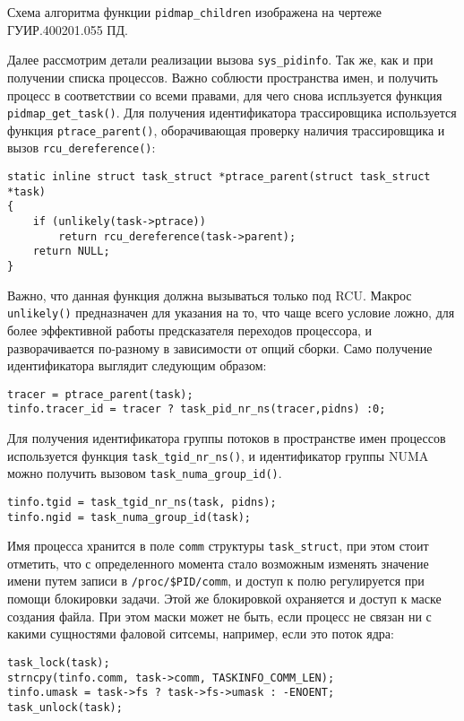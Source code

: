 Схема алгоритма функции \texttt{pidmap\_children} изображена на чертеже
ГУИР.400201.055 ПД.

Далее рассмотрим детали реализации вызова \texttt{sys\_pidinfo}. Так же, как и
при получении списка процессов. Важно соблюсти пространства имен, и получить
процесс в соответствии со всеми правами, для чего снова испльзуется функция
\texttt{pidmap\_get\_task()}. Для получения идентификатора
трассировщика  используется функция \texttt{ptrace\_parent()}, оборачивающая
проверку наличия трассировщика и вызов
\texttt{rcu\_dereference()}:
\medskip
\begin{lstlisting}[style=cstyle]
static inline struct task_struct *ptrace_parent(struct task_struct *task)
{
	if (unlikely(task->ptrace))
		return rcu_dereference(task->parent);
	return NULL;
}
\end{lstlisting}
\medskip

Важно, что данная функция должна вызываться только под RCU. Макрос
\texttt{unlikely()} предназначен для указания на то, что чаще всего условие
ложно, для более эффективной работы предсказателя переходов процессора, и
разворачивается по-разному в зависимости от опций сборки. Само получение
идентификатора выглядит следующим образом:
\medskip
\begin{lstlisting}[style=cstyle]
tracer = ptrace_parent(task);
tinfo.tracer_id = tracer ? task_pid_nr_ns(tracer,pidns) :0;
\end{lstlisting}
\medskip

Для получения идентификатора группы потоков в пространстве имен процессов
используется функция \texttt{task\_tgid\_nr\_ns()}, и идентификатор группы NUMA
можно получить вызовом \texttt{task\_numa\_group\_id()}.
\medskip
\begin{lstlisting}[style=cstyle]
tinfo.tgid = task_tgid_nr_ns(task, pidns);
tinfo.ngid = task_numa_group_id(task);
\end{lstlisting}
\medskip

Имя процесса хранится в поле \texttt{comm} структуры \texttt{task\_struct}, при
этом стоит отметить, что с определенного момента стало возможным изменять
значение имени путем записи в \texttt{/proc/\$PID/comm}, и доступ к полю
регулируется при помощи блокировки задачи. Этой же блокировкой охраняется и
доступ к маске создания файла. При этом маски может не быть, если процесс не
связан ни с какими сущностями фаловой ситсемы, например, если это поток ядра:
\medskip
\begin{lstlisting}[style=cstyle]
task_lock(task);
strncpy(tinfo.comm, task->comm, TASKINFO_COMM_LEN);
tinfo.umask = task->fs ? task->fs->umask : -ENOENT;
task_unlock(task);
\end{lstlisting}
\medskip

